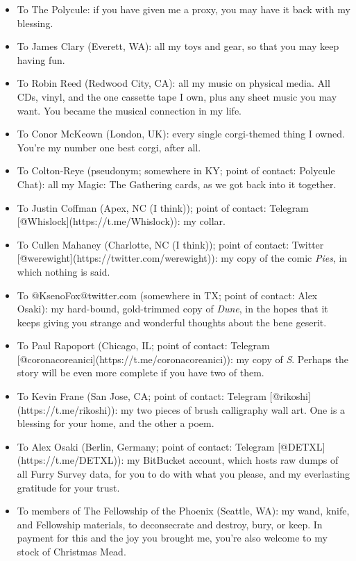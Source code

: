 \begin{enumerate}
  \begin{itemize}
  \tightlist
  \item
    To The Polycule: if you have given me a proxy, you may have it back with my blessing.
  \item
    To James Clary (Everett, WA): all my toys and gear, so that you may keep having fun.
  \item
    To Robin Reed (Redwood City, CA): all my music on physical media. All CDs, vinyl, and the one cassette tape I own, plus any sheet music you may want. You became the musical connection in my life.
  \item
    To Conor McKeown (London, UK): every single corgi-themed thing I owned. You're my number one best corgi, after all.
  \item
    To Colton-Reye (pseudonym; somewhere in KY; point of contact: Polycule Chat): all my Magic: The Gathering cards, as we got back into it together.
  \item
    To Justin Coffman (Apex, NC (I think)); point of contact: Telegram {[}@Whislock{]}(https://t.me/Whislock)): my collar.
  \item
    To Cullen Mahaney (Charlotte, NC (I think)); point of contact: Twitter {[}@werewight{]}(https://twitter.com/werewight)): my copy of the comic \emph{Pies}, in which nothing is said.
  \item
    To @KsenoFox@twitter.com (somewhere in TX; point of contact: Alex Osaki): my hard-bound, gold-trimmed copy of \emph{Dune}, in the hopes that it keeps giving you strange and wonderful thoughts about the bene geserit.
  \item
    To Paul Rapoport (Chicago, IL; point of contact: Telegram {[}@coronacoreanici{]}(https://t.me/coronacoreanici)): my copy of \emph{S}. Perhaps the story will be even more complete if you have two of them.
  \item
    To Kevin Frane (San Jose, CA; point of contact: Telegram {[}@rikoshi{]}(https://t.me/rikoshi)): my two pieces of brush calligraphy wall art. One is a blessing for your home, and the other a poem.
  \item
    To Alex Osaki (Berlin, Germany; point of contact: Telegram {[}@DETXL{]}(https://t.me/DETXL)): my BitBucket account, which hosts raw dumps of all Furry Survey data, for you to do with what you please, and my everlasting gratitude for your trust.
  \item
    To members of The Fellowship of the Phoenix (Seattle, WA): my wand, knife, and Fellowship materials, to deconsecrate and destroy, bury, or keep. In payment for this and the joy you brought me, you're also welcome to my stock of Christmas Mead.
  \end{itemize}
\end{enumerate}

